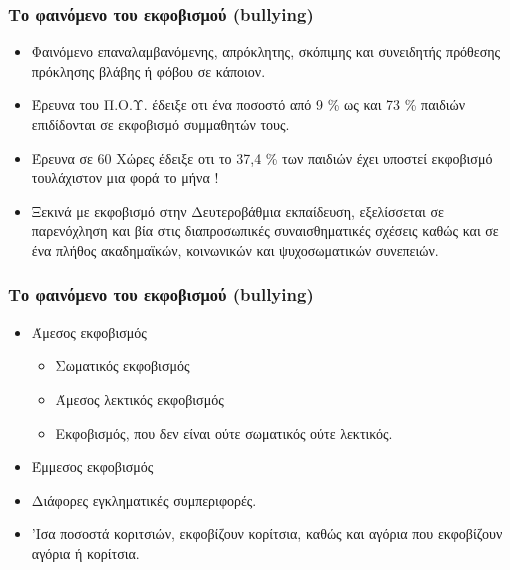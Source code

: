 \documentclass[hyperref={pdfpagelabels=false}, t]{beamer}
\let\olditem=\item%
\renewcommand{\item}{\olditem \justifying}%
\begin{document}
\begin{frame}[t]
\frametitle{Το φαινόμενο του εκφοβισμού (bullying)}
\vspace{-18.5pt}
\begin{adjustwidth}{-0.7cm}{}
\justifying
\begin{itemize}
\item Φαινόμενο επαναλαμβανόμενης, απρόκλητης, σκόπιμης και συνειδητής
  πρόθεσης πρόκλησης βλάβης ή φόβου σε κάποιον. \setlength{\itemsep}{15pt}
\item Έρευνα του Π.Ο.Υ. έδειξε οτι ένα ποσοστό από 9 \% ως και 73 \% παιδιών
επιδίδονται σε εκφοβισμό συμμαθητών τους. \setlength{\itemsep}{15pt}
\item Έρευνα  σε 60 Χώρες έδειξε οτι το 37,4 \% των παιδιών έχει υποστεί
εκφοβισμό τουλάχιστον μια φορά το μήνα !  \setlength{\itemsep}{15pt}
\item Ξεκινά με εκφοβισμό στην Δευτεροβάθμια εκπαίδευση, εξελίσσεται σε
παρενόχληση και βία στις διαπροσωπικές συναισθηματικές σχέσεις καθώς και σε ένα
πλήθος ακαδημαϊκών, κοινωνικών και ψυχοσωματικών συνεπειών.
\end{itemize}
\end{adjustwidth}
\end{frame}

%
%

\begin{frame}[t]
\frametitle{Το φαινόμενο του εκφοβισμού (bullying)}
\vspace{-18.5pt}
\begin{adjustwidth}{-0.7cm}{}
\justifying
\begin{itemize}
\item Άμεσος εκφοβισμός \setlength{\itemsep}{15pt}
\begin{itemize}
  \item Σωματικός εκφοβισμός
  \item Άμεσος λεκτικός εκφοβισμός
  \item Eκφοβισμός, που δεν είναι ούτε σωματικός ούτε λεκτικός.
\end{itemize}
\item Έμμεσος εκφοβισμός  \setlength{\itemsep}{15pt}
\item Διάφορες εγκληματικές συμπεριφορές. \setlength{\itemsep}{15pt}
\item 'Ισα ποσοστά κοριτσιών, εκφοβίζουν κορίτσια, καθώς και αγόρια που
εκφοβίζουν αγόρια ή κορίτσια. %
\end{itemize}
\end{adjustwidth}
\end{frame}
\end{document}
